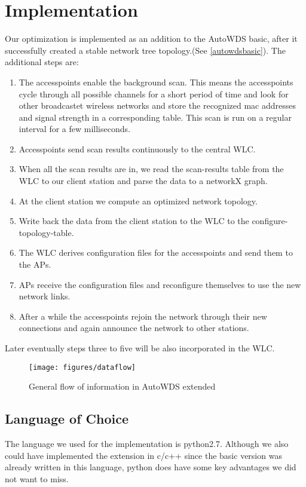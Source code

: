 \chapter{Implementation}
  Our optimization is implemented as an addition to the AutoWDS basic, after it successfully created a stable network tree topology.(See \ref{autowdsbasic}).
  The additional steps are:
  
  \begin{enumerate}
   \item The accesspoints enable the background scan. This means the accesspoints cycle through all possible channels for a short period of time
    and look for other broadcastet wireless networks and store the recognized mac addresses and signal strength in a corresponding table.
    This scan is run on a regular interval for a few milliseconds.
   \item Accesspoints send scan results continuously to the central \ac{WLC}.
   \item When all the scan results are in, we read the scan-results table from the \ac{WLC} to our client station and parse the data to a networkX graph.
   \item At the client station we compute an optimized network topology. 
   \item Write back the data from the client station to the WLC to the configure-topology-table.
   \item The \ac{WLC} derives configuration files for the accesspoints and send them to the APs.
   \item APs receive the configuration files and reconfigure themselves to use the new network links.
   \item After a while the accesspoints rejoin the network through their new connections and again announce the network to other stations.
  \end{enumerate}
  
  Later eventually steps three to five will be also incorporated in the \ac{WLC}.
  
  \begin{figure}[h!]
    \centering
    \texttt{[image: figures/dataflow]}
    \caption{General flow of information in AutoWDS extended}
    \label{fig:dataflow}
  \end{figure}

  \section{Language of Choice}
    The language we used for the implementation is python2.7. Although we also could have implemented the extension in c/c++ since the basic version
    was already written in this language, python does have some key advantages we did not want to miss.
    
